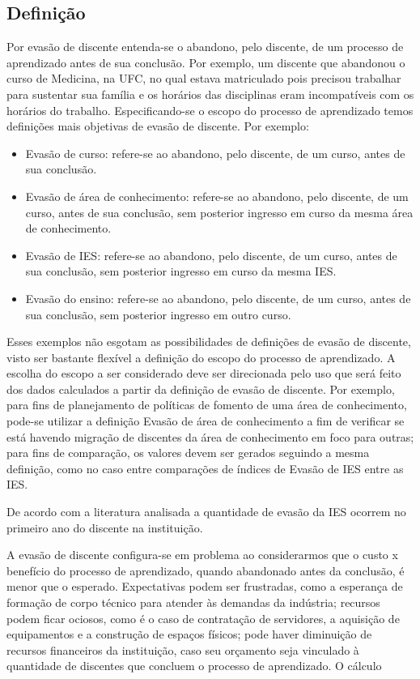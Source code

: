 \documentclass{report}
\begin{document}
\subsection{Definição}
Por evasão de discente entenda-se o abandono, pelo discente, de um processo de aprendizado antes de sua conclusão. Por exemplo, um discente que abandonou o curso de Medicina, na UFC, no qual estava matriculado pois precisou trabalhar para sustentar sua família e os horários das disciplinas eram incompatíveis com os horários do trabalho. Especificando-se o escopo do processo de aprendizado temos definições mais objetivas de evasão de discente. Por exemplo:
\begin{itemize}
\item Evasão de curso: refere-se ao abandono, pelo discente, de um curso, antes de sua conclusão.
\item Evasão de área de conhecimento: refere-se ao abandono, pelo discente, de um curso, antes de sua conclusão, sem posterior ingresso em curso da mesma área de conhecimento.
\item Evasão de IES: refere-se ao abandono, pelo discente, de um curso, antes de sua conclusão, sem posterior ingresso em curso da mesma IES. 
\item Evasão do ensino: refere-se ao abandono, pelo discente, de um curso, antes de sua conclusão, sem posterior ingresso em outro curso.
\end{itemize}

Esses exemplos não esgotam as possibilidades de definições de evasão de discente, visto ser bastante flexível a definição do escopo do processo de aprendizado. A escolha do escopo a ser considerado deve ser direcionada pelo uso que será feito dos dados calculados a partir da definição de evasão de discente. Por exemplo, para fins de planejamento de políticas de fomento de uma área de conhecimento, pode-se utilizar a definição Evasão de área de conhecimento a fim de verificar se está havendo migração de discentes da área de conhecimento em foco para outras; para fins de comparação, os valores devem ser gerados seguindo a mesma definição, como no caso entre comparações de índices de Evasão de IES entre as IES.

De acordo com a literatura analisada \cite{tinto_leaving} \cite{evasao_panorama} a quantidade de evasão da IES ocorrem no primeiro ano do discente na instituição.

A evasão de discente configura-se em problema ao considerarmos que o custo x benefício do processo de aprendizado, quando abandonado antes da conclusão, é menor que o esperado. Expectativas podem ser frustradas, como a esperança de formação de corpo técnico para atender às demandas da indústria; recursos podem ficar ociosos, como é o caso de contratação de servidores, a aquisição de equipamentos e a construção de espaços físicos; pode haver diminuição de recursos financeiros da instituição, caso seu orçamento seja vinculado à quantidade de discentes que concluem o processo de aprendizado. O cálculo 
\end{document}

